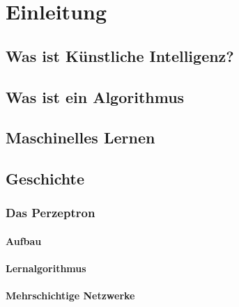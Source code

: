 \chapter{Einleitung} %

	\section{Was ist Künstliche Intelligenz?} %

	\section{Was ist ein Algorithmus} %

	\section{Maschinelles Lernen} %

	\section{Geschichte} %

		\subsection{Das Perzeptron} %

			\subsubsection{Aufbau} %

			\subsubsection{Lernalgorithmus} %

			\subsubsection{Mehrschichtige Netzwerke} %

